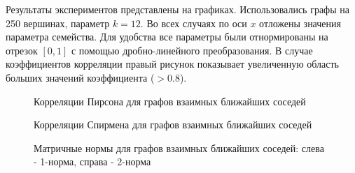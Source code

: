 Результаты экспериментов представлены на графиках. Использовались графы на 250 вершинах, параметр $k = 12$. 
Во всех случаях по оси $x$ отложены значения параметра семейства. Для удобства все параметры были отнормированы на отрезок $[0,1]$ с помощью дробно-линейного преобразования. В случае коэффициентов корреляции правый рисунок показывает увеличенную область больших значений коэффициента ($>0.8$).

\begin{figure}[!htbp]
  \begin{minipage}[h]{0.49\linewidth}
  \end{minipage}
  \hfill
  \begin{minipage}[h]{0.49\linewidth}
  \end{minipage}

  \caption{Корреляции Пирсона для графов взаимных ближайших соседей}
  \label{img:mut_graphs}  
\end{figure}

\begin{figure}[h]
  \begin{minipage}[h]{0.49\linewidth}
  \end{minipage}
  \hfill
  \begin{minipage}[h]{0.49\linewidth}
  \end{minipage}

  \caption{Корреляции Спирмена для графов взаимных ближайших соседей}
  \label{img:mut_graphs_sp}  
\end{figure}


\begin{figure}[h]
  \begin{minipage}[h]{0.49\linewidth}
  \end{minipage}
  \hfill
  \begin{minipage}[h]{0.49\linewidth}
  \end{minipage}

  \caption{Матричные нормы для графов взаимных ближайших соседей: слева - 1-норма, справа - 2-норма}
  \label{img:mut_graphs_norm}  
\end{figure}

